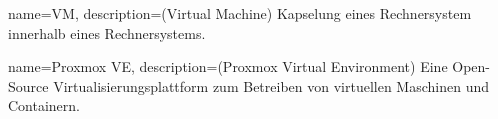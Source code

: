 \usepackage[utf8]{inputenc}
\usepackage{amsfonts}
\usepackage{amssymb }
\usepackage[ngerman,english]{babel}
\usepackage{ upgreek }
\usepackage{bibgerm}
\usepackage[square,sort,comma,numbers]{natbib}%


\usepackage[official]{eurosym}
\usepackage{graphicx}
\usepackage{caption}
\usepackage{subcaption}
\usepackage{graphviz}
\usepackage[hidelinks]{hyperref}
\usepackage[dvipsnames]{xcolor}

\usepackage{comment}
\usepackage{geometry}
\usepackage{tikz}
\geometry{a4paper, portrait,left=2.5cm, right=2.5cm, top=2cm, bottom=3.5cm}
\usepackage[T1]{fontenc}
\usepackage{lmodern}

\usepackage{array}
\usepackage{listings} %

\usepackage{hyperref}
\hypersetup{
    colorlinks=true,
    linkcolor=black,
    filecolor=magenta,      
    urlcolor=blue,
    citecolor=black,
}


\usepackage[font=itshape]{quoting}


\usepackage{fancyhdr}

\pagestyle{fancy}
\fancyhf{}
\renewcommand{\footrulewidth}{1pt}
\lhead{\leftmark} %


\usepackage{glossaries}

\makeglossaries

{
name=VM,
description={(Virtual Machine) Kapselung eines Rechnersystem innerhalb eines Rechnersystems.}
}

{
name=Proxmox VE,
description={(Proxmox Virtual Environment) Eine Open-Source Virtualisierungsplattform zum Betreiben von virtuellen Maschinen und Containern.}
}

